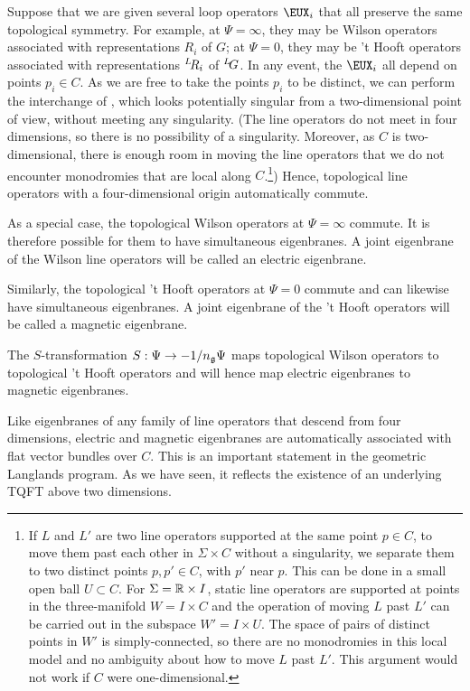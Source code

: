 Suppose that we are given several loop operators $\EUX_i$ that all
preserve the same topological symmetry.  For example, at
$\Psi=\infty$, they may be Wilson operators associated with
representations $R_i$ of $G$; at $\Psi=0$, they may be 't Hooft
operators associated with representations $^L\negthinspace R_i$ of
$^L\negthinspace G$. In any event, the $\EUX_i$ all depend on
points $p_i\in C$. As we are free to take the points $p_i$ to be
distinct, we can perform the interchange of \quintamp, which looks
potentially singular from a two-dimensional point of view, without
meeting any singularity. (The line operators do not meet in four
dimensions, so there is no possibility of a singularity. Moreover,
as $C$ is two-dimensional, there is enough room in moving the line
operators that we do not encounter monodromies that are local
along $C$.\footnote{If $L$ and $L'$ are two line operators supported
at the same point $p\in C$, to move them past each other in
$\Sigma\times C$ without a singularity, we separate them to two
distinct points $p,p'\in C$, with $p'$ near $p$. This can be done
in a small open ball $U\subset C$. For $\Sigma=\Bbb{R}\times I$,
static line operators are supported at points in the
three-manifold $W=I\times C$ and the operation of moving $L$ past
$L'$ can be carried out in the subspace $W'=I\times U$. The space
of pairs of distinct points in $W'$ is simply-connected, so there
are no monodromies in this local model and no ambiguity about how
to move $L$ past $L'$. This argument would not work if $C$ were
one-dimensional.}) Hence, topological line operators with a
four-dimensional origin automatically commute.

\par{}

As a special case, the topological Wilson operators at
$\Psi=\infty$ commute. It is therefore possible for them to have
simultaneous eigenbranes.  A joint eigenbrane of the Wilson line
operators will be called an electric eigenbrane.

Similarly, the topological 't Hooft operators at $\Psi=0$ commute
and can likewise have simultaneous eigenbranes.  A joint
eigenbrane of the 't Hooft operators will be called a magnetic
eigenbrane.

The $S$-transformation $S:\Psi\to -1/n_{\frak g}\Psi$ maps
topological Wilson operators to topological 't Hooft operators and
will hence map electric eigenbranes to magnetic eigenbranes.

Like eigenbranes of any family of line operators that descend from
four dimensions, electric and magnetic eigenbranes are
automatically associated with flat vector bundles over $C$.  This
is an important statement in the geometric Langlands program.  As
we have seen, it reflects the existence of an underlying TQFT
above two dimensions.


